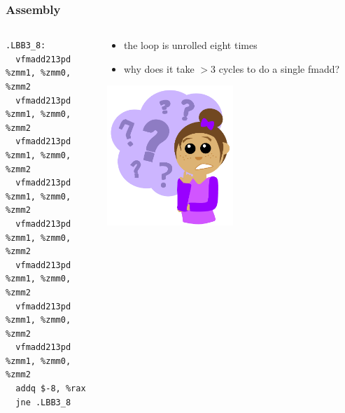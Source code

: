 \documentclass[12pt,dvipdfmx]{beamer}
\begin{document}
\begin{frame}[fragile]
\frametitle{Assembly}
\begin{columns}
\begin{column}{0.52\textwidth}
{\footnotesize
\begin{lstlisting}
.LBB3_8:
  vfmadd213pd %zmm1, %zmm0, %zmm2
  vfmadd213pd %zmm1, %zmm0, %zmm2
  vfmadd213pd %zmm1, %zmm0, %zmm2
  vfmadd213pd %zmm1, %zmm0, %zmm2
  vfmadd213pd %zmm1, %zmm0, %zmm2
  vfmadd213pd %zmm1, %zmm0, %zmm2
  vfmadd213pd %zmm1, %zmm0, %zmm2
  vfmadd213pd %zmm1, %zmm0, %zmm2
  addq $-8, %rax
  jne .LBB3_8
\end{lstlisting}} %
\end{column}

\begin{column}{0.48\textwidth}
\begin{itemize}
\item the loop is unrolled eight times
\item why does it take $> 3$ cycles to do a single fmadd?
\end{itemize}

\begin{center}
\includegraphics[width=0.5\textwidth]{out/pdf/svg/Question_Girl.pdf}  
\end{center}
\end{column}
\end{columns}
\end{frame}
\end{document}
